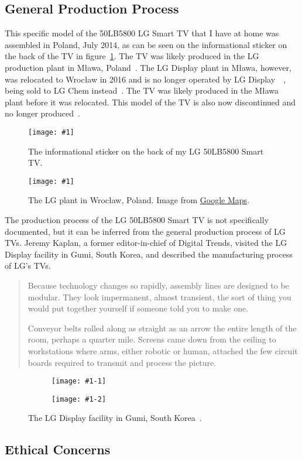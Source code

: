 \documentclass[12pt, letterpaper]{article}
\makeatletter
\newcommand{\img}[2]{
  \begin{figure}[H]
    \medskip
    \centering
    \texttt{[image: \#1]}
    \caption{#2}
    \medskip\label{fig:#1}
  \end{figure}
}
\newcommand{\imgs}[2]{
  \begin{figure}[H]
    \medskip
    \begin{subfigure}{.5\textwidth}
      \centering
      \texttt{[image: \#1-1]}
    \end{subfigure}%
    \begin{subfigure}{.5\textwidth}
      \centering
      \texttt{[image: \#1-2]}
    \end{subfigure}
    \caption{#2}
    \medskip\label{fig:#1}
  \end{figure}
}
\newcommand\todo[1]{{\color{red}{\footnotesize[TODO:\@ #1]}}}
\makeatother
\begin{document}
\subsection{General Production Process}

This specific model of the 50LB5800 LG Smart TV that I have at home
was assembled in Poland, July 2014, as can be seen on the
informational sticker on the back of the TV in
figure~\ref{fig:lg-back-label}. The TV was likely produced in the LG
production plant in Mława, Poland~\autocite{lg-2020}. The LG Display
plant in Mława, however, was relocated to Wrocław in 2016 and is no
longer operated by LG
Display~\autocite{allen-2016}~\autocite{evertiq-ab-2016}, being sold
to LG Chem instead~\autocite{shah-2024}. The TV was likely produced
in the Mława plant before it was relocated. This model of the TV is
also now discontinued and no longer produced~\autocite{unknown-author-no-dateB}.

\img{lg-back-label}{The informational sticker on the back of my LG
50LB5800 Smart TV.}

\img{lgensol-wroclaw-google-maps}{The LG plant in Wrocław, Poland.
Image from \href{https://maps.app.goo.gl/vMukYzKtPBX12RGo9}{Google Maps}.}

The production process of the LG 50LB5800 Smart TV is not
specifically documented, but it can be inferred from the general
production process of LG TVs. Jeremy Kaplan, a former editor-in-chief of
Digital Trends, visited the LG Display facility in Gumi, South Korea,
and described the manufacturing process of LG's TVs.

\begin{quote}
  Because technology changes so rapidly, assembly lines are designed
  to be modular. They look impermanent, almost transient, the sort of
  thing you would put together yourself if someone told you to make one.

  Conveyor belts rolled along as straight as an arrow the entire
  length of the room, perhaps a quarter mile. Screens came down from
  the ceiling to workstations where arms, either robotic or human,
  attached the few circuit boards required to transmit and process the picture.
\end{quote}

\imgs{gumi-facility}{The LG Display facility in Gumi, South
Korea~\autocite{kaplan-2016}.}

\todo{Is this enough for criterion B?}

\subsection{Ethical Concerns}
\end{document}
